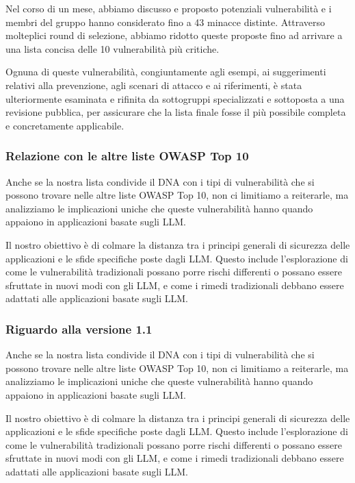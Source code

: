 \documentclass[
]{article}
\begin{document}
Nel corso di un mese, abbiamo discusso e proposto potenziali
vulnerabilità e i membri del gruppo hanno considerato fino a 43 minacce
distinte. Attraverso molteplici round di selezione, abbiamo ridotto
queste proposte fino ad arrivare a una lista concisa delle 10
vulnerabilità più critiche.

Ognuna di queste vulnerabilità, congiuntamente agli esempi, ai
suggerimenti relativi alla prevenzione, agli scenari di attacco e ai
riferimenti, è stata ulteriormente esaminata e rifinita da sottogruppi
specializzati e sottoposta a una revisione pubblica, per assicurare che
la lista finale fosse il più possibile completa e concretamente
applicabile.

\subsubsection{Relazione con le altre liste OWASP Top
10}\label{relazione-con-le-altre-liste-owasp-top-10}

Anche se la nostra lista condivide il DNA con i tipi di vulnerabilità
che si possono trovare nelle altre liste OWASP Top 10, non ci limitiamo
a reiterarle, ma analizziamo le implicazioni uniche che queste
vulnerabilità hanno quando appaiono in applicazioni basate sugli LLM.

Il nostro obiettivo è di colmare la distanza tra i principi generali di
sicurezza delle applicazioni e le sfide specifiche poste dagli LLM.
Questo include l'esplorazione di come le vulnerabilità tradizionali
possano porre rischi differenti o possano essere sfruttate in nuovi modi
con gli LLM, e come i rimedi tradizionali debbano essere adattati alle
applicazioni basate sugli LLM.

\subsubsection{Riguardo alla versione
1.1}\label{riguardo-alla-versione-1.1}

Anche se la nostra lista condivide il DNA con i tipi di vulnerabilità
che si possono trovare nelle altre liste OWASP Top 10, non ci limitiamo
a reiterarle, ma analizziamo le implicazioni uniche che queste
vulnerabilità hanno quando appaiono in applicazioni basate sugli LLM.

Il nostro obiettivo è di colmare la distanza tra i principi generali di
sicurezza delle applicazioni e le sfide specifiche poste dagli LLM.
Questo include l'esplorazione di come le vulnerabilità tradizionali
possano porre rischi differenti o possano essere sfruttate in nuovi modi
con gli LLM, e come i rimedi tradizionali debbano essere adattati alle
applicazioni basate sugli LLM.
\end{document}
